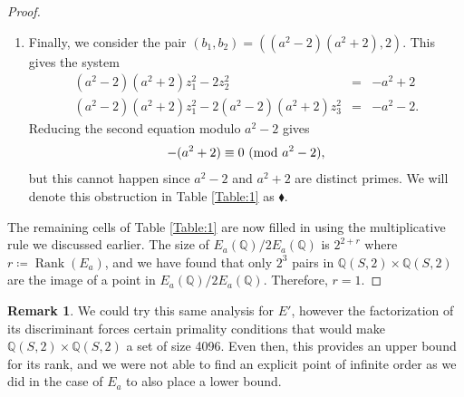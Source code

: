 \documentclass{article}
\newcommand{\Q}{\mathbb{Q}}
\theoremstyle{definition}
\newtheorem{remark}{Remark}
\DeclareMathOperator{\Rank}{Rank}
\begin{document}
\begin{proof}
\begin{enumerate}
    \item Finally, we consider the pair $(b_1,b_2)=((a^2-2)(a^2+2),2)$. This gives the system
    \begin{eqnarray*}
        (a^2-2)(a^2+2)z_1^2 - 2z_2^2 &=& -a^2 + 2 \\
        (a^2-2)(a^2+2)z_1^2 - 2(a^2-2)(a^2+2)z_3^2 &=& -a^2 - 2.
    \end{eqnarray*}
    Reducing the second equation modulo $a^2-2$ gives 
    \begin{eqnarray*}
        -(a^2+2) \equiv 0 \textnormal{ (mod }a^2-2),
    \end{eqnarray*}
    but this cannot happen since $a^2-2$ and $a^2+2$ are distinct primes. We will denote this obstruction in Table \ref{Table:1} as $\blacklozenge$.
\end{enumerate}
The remaining cells of Table \ref{Table:1} are now filled in using the multiplicative rule we discussed earlier. The size of $E_a(\Q)/2E_a(\Q)$ is $2^{2+r}$ where $r \coloneq \Rank(E_a)$, and we have found that only $2^3$ pairs in $\Q(S,2) \times \Q(S,2)$ are the image of a point in $E_a(\Q)/2E_a(\Q)$. Therefore, $r = 1$.
\end{proof}

\begin{remark}
    We could try this same analysis for $E'$, however the factorization of its discriminant forces certain primality conditions that would make $\Q(S,2) \times \Q(S,2)$ a set of size 4096. Even then, this provides an upper bound for its rank, and we were not able to find an explicit point of infinite order as we did in the case of $E_a$ to also place a lower bound.
\end{remark}
\end{document}
